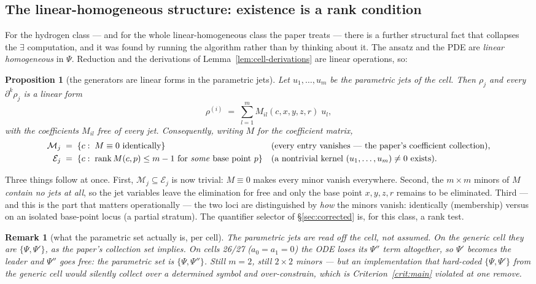 \documentclass[11pt]{article}
\newcommand{\Psib}{\Psi}
\newcommand{\Mem}{\mathcal{M}}
\newcommand{\Ex}{\mathcal{E}}
\newtheorem{proposition}{Proposition}
\newtheorem{remark}{Remark}
\begin{document}
\subsection{The linear-homogeneous structure: existence is a rank condition}
\label{sec:rank}

For the hydrogen class --- and for the whole linear-homogeneous class the paper
treats --- there is a further structural fact that collapses the $\exists$
computation, and it was found by running the algorithm rather than by thinking
about it. The ansatz and the PDE are \emph{linear homogeneous} in $\Psib$.
Reduction and the derivations of Lemma~\ref{lem:cell-derivations} are linear
operations, so:

\begin{proposition}[the generators are linear forms in the parametric jets]
\label{prop:linear}
Let $u_1,\dots,u_m$ be the parametric jets of the cell. Then $\rho_j$ and every
$\partial^k\rho_j$ is a linear form
\[
  \rho^{(i)} \;=\; \sum_{l=1}^{m} M_{il}(c,x,y,z,r)\; u_l ,
\]
with the coefficients $M_{il}$ free of every jet. Consequently, writing $M$ for
the coefficient matrix,
\begin{align}
\Mem_j &\;=\; \{c :\; M \equiv 0 \ \text{identically}\}
   && \text{(every entry vanishes --- the paper's coefficient collection),}\\
\Ex_j  &\;=\; \{c :\; \operatorname{rank} M(c,p) \le m-1 \ \text{for \emph{some}
   base point } p\}
   && \text{(a nontrivial kernel $(u_1,\dots,u_m)\neq 0$ exists).}
\end{align}
\end{proposition}

Three things follow at once. First, $\Mem_j \subseteq \Ex_j$ is now trivial:
$M\equiv 0$ makes every minor vanish everywhere. Second, the $m\times m$ minors
of $M$ \emph{contain no jets at all}, so the jet variables leave the elimination
for free and only the base point $x,y,z,r$ remains to be eliminated. Third --- and
this is the part that matters operationally --- the two loci are distinguished
by \emph{how} the minors vanish: identically (membership) versus on an isolated
base-point locus (a partial stratum). The quantifier selector of
\S\ref{sec:corrected} is, for this class, a rank test.

\begin{remark}[what the parametric set actually is, per cell]
The parametric jets are read off the cell, not assumed. On the generic cell they
are $\{\Psib,\Psib'\}$, as the paper's collection set implies. On cells 26/27
($a_0=a_1=0$) the ODE loses its $\Psib''$ term altogether, so $\Psib'$ becomes
the leader and $\Psib''$ goes \emph{free}: the parametric set is
$\{\Psib,\Psib''\}$. Still $m=2$, still $2\times2$ minors --- but an
implementation that hard-coded $\{\Psib,\Psib'\}$ from the generic cell would
silently collect over a determined symbol and over-constrain, which is
Criterion~\ref{crit:main} violated at one remove.
\end{remark}
\end{document}
